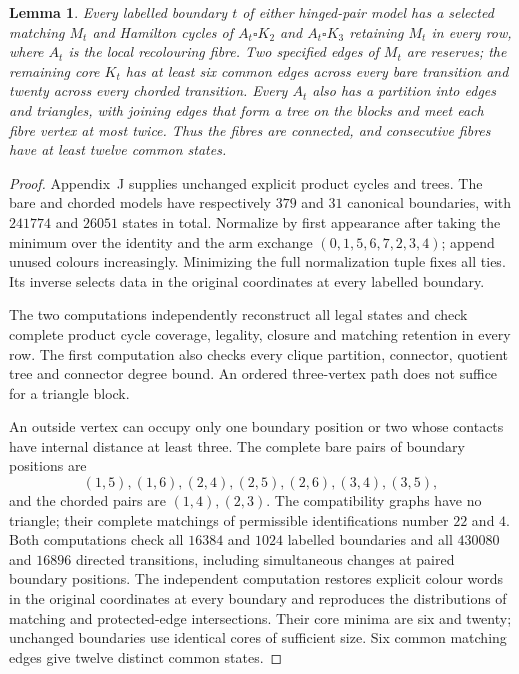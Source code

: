 \documentclass[11pt]{article}
\newtheorem{lemma}[theorem]{Lemma}
\theoremstyle{remark}
\numberwithin{equation}{section}
\numberwithin{table}{section}
\begin{document}
\begin{lemma}\label{lem:hinged-data}
Every labelled boundary $t$ of either hinged-pair model has a selected
matching $M_t$ and Hamilton cycles of $A_t\square K_2$ and
$A_t\square K_3$ retaining $M_t$ in every row, where $A_t$
is the local recolouring fibre. Two specified edges of $M_t$ are
reserves; the remaining core $K_t$ has at least six common edges
across every bare transition and twenty across every chorded transition.
Every $A_t$ also has a partition into edges and triangles, with joining
edges that form a tree on the blocks and meet each fibre vertex at most twice. Thus the fibres are connected,
and consecutive fibres have at least twelve common states.
\end{lemma}
\begin{proof}
Appendix~J supplies unchanged explicit product cycles and trees.
The bare and chorded models have respectively $379$ and $31$ canonical
boundaries, with $241774$ and $26051$ states in total. Normalize by
first appearance after taking the minimum over the identity and the
arm exchange $(0,1,5,6,7,2,3,4)$; append unused colours increasingly.
Minimizing the full normalization tuple fixes all ties. Its inverse
selects data in the original coordinates at every labelled boundary.

The two computations independently reconstruct all legal states and check
complete product cycle coverage, legality, closure and matching retention in
every row. The first computation also checks every clique partition,
connector, quotient tree and connector degree bound. An ordered
three-vertex path does not suffice for a triangle block.

An outside vertex can occupy only one boundary position or two whose contacts
have internal distance at least three. The complete bare pairs of boundary positions are
\[
 (1,5),(1,6),(2,4),(2,5),(2,6),(3,4),(3,5),
\]
and the chorded pairs are $(1,4),(2,3)$. The compatibility graphs
have no triangle; their complete matchings of permissible identifications number $22$ and $4$.
Both computations check all $16384$ and $1024$ labelled boundaries and
all $430080$ and $16896$ directed transitions, including simultaneous
changes at paired boundary positions. The independent computation restores explicit
colour words in the original coordinates at every boundary and reproduces the distributions of matching
and protected-edge intersections. Their core minima are six and
twenty; unchanged boundaries use identical cores of sufficient size.
Six common matching edges give twelve distinct common states.
\end{proof}
\end{document}

